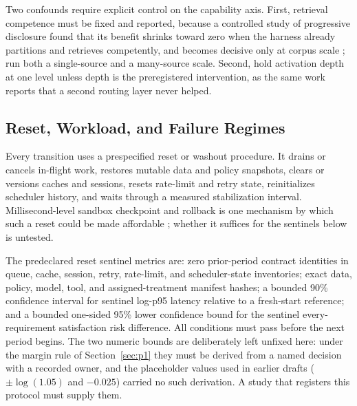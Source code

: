 \documentclass[11pt]{article}
\begin{document}
Two confounds require explicit control on the capability axis. First, retrieval competence must be fixed and reported, because a controlled study of progressive disclosure found that its benefit shrinks toward zero when the harness already partitions and retrieves competently, and becomes decisive only at corpus scale \cite{he2026disclosure}; run both a single-source and a many-source scale. Second, hold activation depth at one level unless depth is the preregistered intervention, as the same work reports that a second routing layer never helped.

\subsection{Reset, Workload, and Failure Regimes}

Every transition uses a prespecified reset or washout procedure. It drains or cancels in-flight work, restores mutable data and policy snapshots, clears or versions caches and sessions, resets rate-limit and retry state, reinitializes scheduler history, and waits through a measured stabilization interval. Millisecond-level sandbox checkpoint and rollback is one mechanism by which such a reset could be made affordable \cite{dong2026deltabox}; whether it suffices for the sentinels below is untested.

The predeclared reset sentinel metrics are: zero prior-period contract identities in queue, cache, session, retry, rate-limit, and scheduler-state inventories; exact data, policy, model, tool, and assigned-treatment manifest hashes; a bounded 90\% confidence interval for sentinel log-p95 latency relative to a fresh-start reference; and a bounded one-sided 95\% lower confidence bound for the sentinel every-requirement satisfaction risk difference. All conditions must pass before the next period begins. The two numeric bounds are deliberately left unfixed here: under the margin rule of Section~\ref{sec:p1} they must be derived from a named decision with a recorded owner, and the placeholder values used in earlier drafts ($\pm\log(1.05)$ and $-0.025$) carried no such derivation. A study that registers this protocol must supply them.
\end{document}
